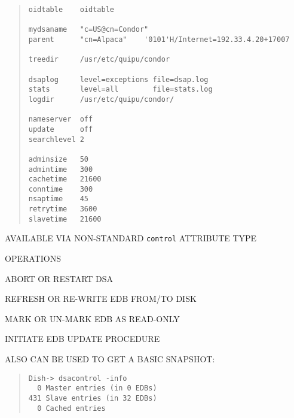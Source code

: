 \begin{bwslide}

\begin{quote}\small\begin{verbatim}
oidtable    oidtable

mydsaname   "c=US@cn=Condor"
parent      "cn=Alpaca"    '0101'H/Internet=192.33.4.20+17007

treedir     /usr/etc/quipu/condor

dsaplog     level=exceptions file=dsap.log
stats       level=all        file=stats.log
logdir      /usr/etc/quipu/condor/

nameserver  off
update      off
searchlevel 2

adminsize   50
admintime   300
cachetime   21600
conntime    300
nsaptime    45
retrytime   3600
slavetime   21600
\end{verbatim}\end{quote}
\end{bwslide}


\begin{bwslide}

\begin{nrtc}
\item	AVAILABLE VIA NON-STANDARD \verb"control" ATTRIBUTE TYPE

\item	OPERATIONS
    \begin{nrtc}
    \item	ABORT OR RESTART DSA

    \item	REFRESH OR RE-WRITE EDB FROM/TO DISK

    \item	MARK OR UN-MARK EDB AS READ-ONLY

    \item	INITIATE EDB UPDATE PROCEDURE
    \end{nrtc}

\item	ALSO CAN BE USED TO GET A BASIC SNAPSHOT:
\begin{quote}\small\begin{verbatim}
Dish-> dsacontrol -info
  0 Master entries (in 0 EDBs)
431 Slave entries (in 32 EDBs)
  0 Cached entries
\end{verbatim}\end{quote}
\end{nrtc}
\end{bwslide}


